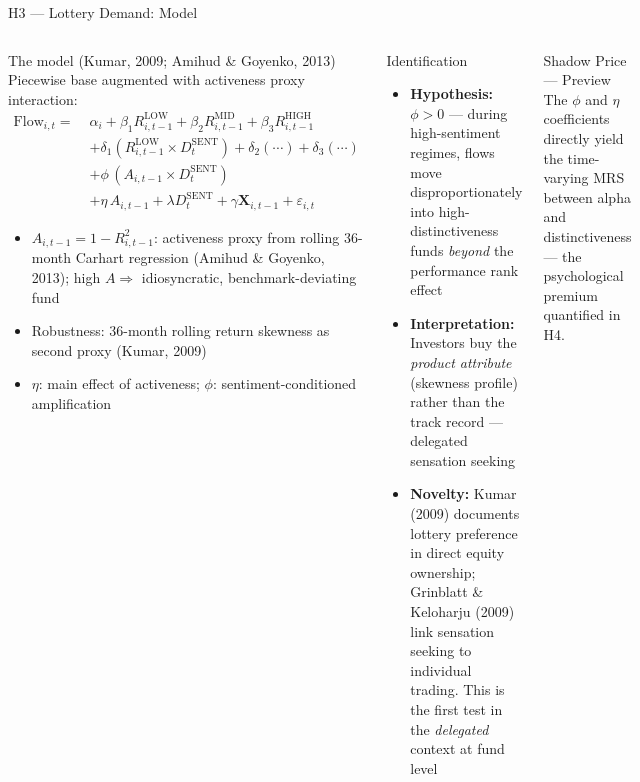 \documentclass[aspectratio=169,10pt]{beamer}
\begin{document}
\begin{frame}{H3 — Lottery Demand: Model}
\begin{columns}[T]
\begin{block}{The model (Kumar, 2009; Amihud \& Goyenko, 2013)}
{\footnotesize Piecewise base augmented with activeness proxy interaction:}
{\footnotesize
\begin{align*}
\mathrm{Flow}_{i,t} = \;&\alpha_i + \beta_1 R^{\mathrm{LOW}}_{i,t-1} + \beta_2 R^{\mathrm{MID}}_{i,t-1} + \beta_3 R^{\mathrm{HIGH}}_{i,t-1} \\
&+ \delta_1 (R^{\mathrm{LOW}}_{i,t-1} \times D^{\mathrm{SENT}}_t) + \delta_2(\cdots) + \delta_3(\cdots) \\
&+ \phi\,(A_{i,t-1} \times D^{\mathrm{SENT}}_t) \\
&+ \eta\,A_{i,t-1} + \lambda D^{\mathrm{SENT}}_t + \gamma \mathbf{X}_{i,t-1} + \varepsilon_{i,t}
\end{align*}}
{\footnotesize
\begin{itemize}
  \item $A_{i,t-1} = 1 - R^2_{i,t-1}$: activeness proxy from rolling 36-month Carhart regression (Amihud \& Goyenko, 2013); high $A \Rightarrow$ idiosyncratic, benchmark-deviating fund
  \item Robustness: 36-month rolling return skewness as second proxy (Kumar, 2009)
  \item $\eta$: main effect of activeness; $\phi$: sentiment-conditioned amplification
\end{itemize}}
\end{block}

\begin{block}{Identification}
{\footnotesize
\begin{itemize}
  \item \textbf{Hypothesis:} $\phi > 0$ — during high-sentiment regimes, flows move disproportionately into high-distinctiveness funds \emph{beyond} the performance rank effect
  \item \textbf{Interpretation:} Investors buy the \emph{product attribute} (skewness profile) rather than the track record — delegated sensation seeking
  \item \textbf{Novelty:} Kumar (2009) documents lottery preference in direct equity ownership; Grinblatt \& Keloharju (2009) link sensation seeking to individual trading. This is the first test in the \emph{delegated} context at fund level
\end{itemize}}
\end{block}

\begin{block}{Shadow Price — Preview}
{\footnotesize The $\phi$ and $\eta$ coefficients directly yield the time-varying MRS between alpha and distinctiveness — the psychological premium quantified in H4.}
\end{block}
\end{columns}
\end{frame}
\end{document}
